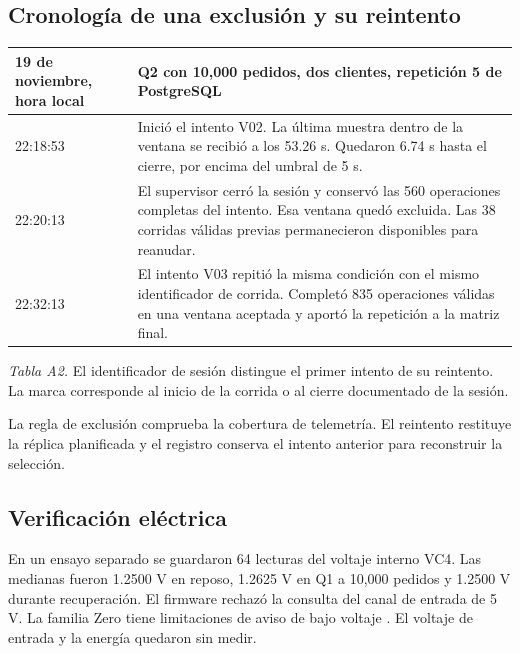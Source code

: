 \documentclass[10pt,a4paper]{article}
\begin{document}
\subsection{Cronología de una exclusión y su reintento}
\begin{center}
\small
\begin{tabularx}{.98\linewidth}{@{}lX@{}}
\toprule 19 de noviembre, hora local & Q2 con 10,000 pedidos, dos clientes, repetición 5 de PostgreSQL\\
\midrule
22:18:53 & Inició el intento V02. La última muestra dentro de la ventana se recibió a los 53.26 s. Quedaron 6.74 s hasta el cierre, por encima del umbral de 5 s.\\
22:20:13 & El supervisor cerró la sesión y conservó las 560 operaciones completas del intento. Esa ventana quedó excluida. Las 38 corridas válidas previas permanecieron disponibles para reanudar.\\
22:32:13 & El intento V03 repitió la misma condición con el mismo identificador de corrida. Completó 835 operaciones válidas en una ventana aceptada y aportó la repetición a la matriz final.\\
\bottomrule
\end{tabularx}
\par\smallskip\textit{Tabla A2.} El identificador de sesión distingue el primer intento de su reintento. La marca corresponde al inicio de la corrida o al cierre documentado de la sesión.
\end{center}
La regla de exclusión comprueba la cobertura de telemetría. El reintento restituye la réplica planificada y el registro conserva el intento anterior para reconstruir la selección.

\subsection{Verificación eléctrica}
En un ensayo separado se guardaron 64 lecturas del voltaje interno VC4. Las medianas fueron 1.2500 V en reposo, 1.2625 V en Q1 a 10,000 pedidos y 1.2500 V durante recuperación. El firmware rechazó la consulta del canal de entrada de 5 V. La familia Zero tiene limitaciones de aviso de bajo voltaje \cite{firmware,power}. El voltaje de entrada y la energía quedaron sin medir.
\end{document}
